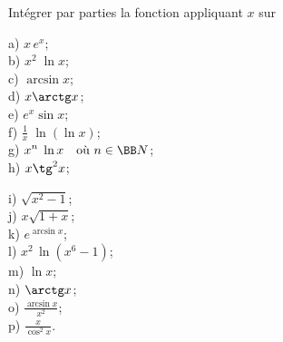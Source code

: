 \documentclass[12pt,french,oneside,a4paper]{memoir} %
\begin{document}
\begin{exo}
Intégrer par parties
la fonction appliquant $x$ sur\\

\hfil
\begin{minipage}[t]{6cm}
a) $\displaystyle{x\,e^x}$;\\[2mm]
b) $\displaystyle{x^2\;\ln x}$;\\[2mm]
c) $\displaystyle{\arcsin x}$;\\[2mm]
d) $\displaystyle{x\arctg x}$;\\[2mm]
e) $\displaystyle{e^x\sin x}$;\\[2mm]
f) $\displaystyle{\frac{1}{x}\;\ln(\ln x)}$;\\[2mm]
g) $\displaystyle{x^n\;\ln x}\quad\mbox{où }n\in\BB N$;\\[2mm] h) $\displaystyle{x\tg^2x}$;
\end{minipage}
\hfill
\begin{minipage}[t]{8cm}
i) $\displaystyle{\sqrt{x^2-1}}$;\\[2mm]
j) $\displaystyle{x\sqrt{1+x}}$;\\[2mm]
k) $\displaystyle{e^{\arcsin x}}$;\\[2mm]
l) $\displaystyle{x^2\,\ln(x^6-1)}$;\\[2mm]
m) $\displaystyle{\ln x}$;\\[2mm]
n) $\displaystyle{\arctg x}$;\\[2mm]
o) $\displaystyle{\frac{\arcsin x}{x^2}}$;\\[2mm]
p) $\displaystyle{\frac{x}{\cos^2x}}$.
\end{minipage}
\hfill
\end{exo}
\end{document}

